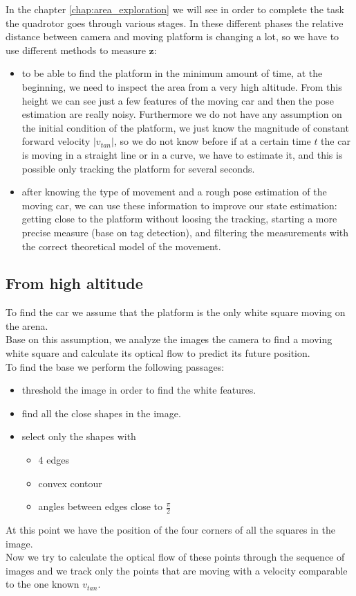 In the chapter \ref{chap:area_exploration} we will see in order to complete the task the quadrotor goes through various stages. In these different phases the relative distance between camera and moving platform is changing a lot, so we have to use different methods to measure $\boldsymbol{z}$:
\begin{itemize}
\item to be able to find the platform in the minimum amount of time, at the beginning, we need to inspect the area from a very high altitude. From this height we can see just a few features of the moving car and then the pose estimation are really noisy. Furthermore we do not have any assumption on the initial condition of the platform, we just know the magnitude of constant forward velocity $|v_{tan}|$, so we do not know before if at a certain time $t$ the car is moving in a straight line or in a curve, we have to estimate it, and this is possible only tracking the platform for several seconds. 
\item after knowing the type of movement and a rough pose estimation of the moving car, we can use these information to improve our state estimation: getting close to the platform without loosing the tracking, starting a more precise measure (base on tag detection), and filtering the measurements with the correct theoretical model of the movement.
\end{itemize}

\subsection{From high altitude}
To find the car we assume that the platform is the only white square moving on the arena.\\
Base on this assumption, we analyze the images the camera to find a moving white square and calculate its optical flow to predict its future position.\\
To find the base we perform the following passages:
\begin{itemize}
\item threshold the image in order to find the white features.
\item find all the close shapes in the image.
\item select only the shapes with
\begin{itemize}
\item 4 edges
\item convex contour
\item angles between edges close to $\frac{\pi}{2}$
\end{itemize}
\end{itemize}
At this point we have the position of the four corners of all the squares in the image.\\
Now we try to calculate the optical flow of these points through the sequence of images and we track only the points that are moving with a velocity comparable to the one known $v_{tan}$.\\

